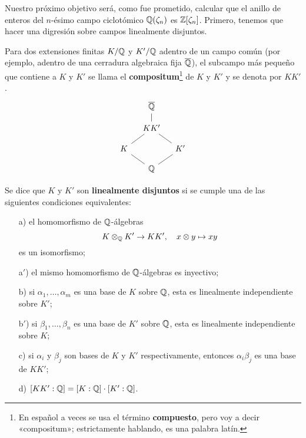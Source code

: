 Nuestro próximo objetivo será, como fue prometido, calcular que el anillo de
enteros del $n$-ésimo campo ciclotómico $\mathbb{Q} (\zeta_n)$ es
$\mathbb{Z} [\zeta_n]$. Primero, tenemos que hacer una digresión sobre campos
linealmente disjuntos.

\begin{definicion}
  Para dos extensiones finitas $K/\mathbb{Q}$ y $K'/\mathbb{Q}$ adentro de un campo común
  (por ejemplo, adentro de una cerradura algebraica fija $\overline{\mathbb{Q}}$),
  el subcampo más pequeño que contiene a $K$ y $K'$ se llama el
  \textbf{compositum}\footnote{En español a veces se usa el término
    \textbf{compuesto}, pero voy a decir «compositum»; estrictamente hablando,
    es una palabra latín.} de $K$ y $K'$ y se denota por $K K'$.
  \[ \begin{tikzcd}[row sep=1em,column sep=1em]
    & \overline{\QQ}\ar[-]{d} \\
    & KK'\ar[-]{dl}\ar[-]{dr} \\
    K\ar[-]{dr} & & K'\ar[-]{dl} \\
    & \QQ
  \end{tikzcd} \]

  Se dice que $K$ y $K'$ son \textbf{linealmente disjuntos} si se cumple una
  de las siguientes condiciones equivalentes:
  \begin{enumerate}
  \item[a)] el homomorfismo de $\mathbb{Q}$-álgebras
    $$K\otimes_{\mathbb{Q}} K'\to K K', \quad x\otimes y \mapsto xy$$
    es un isomorfismo;

  \item[a${}'$)] el mismo homomorfismo de $\mathbb{Q}$-álgebras es inyectivo;

  \item[b)] si $\alpha_1, \ldots, \alpha_m$ es una base de $K$ sobre $\mathbb{Q}$,
    esta es linealmente independiente sobre $K'$;

  \item[b${}'$)] si $\beta_1, \ldots, \beta_n$ es una base de $K'$ sobre $\mathbb{Q}$,
    esta es linealmente independiente sobre $K$;

  \item[c)] si $\alpha_i$ y $\beta_j$ son bases de $K$ y $K'$ respectivamente,
    entonces $\alpha_i \beta_j$ es una base de $K K'$;

  \item[d)] $[KK' : \mathbb{Q}] = [K : \mathbb{Q}]\cdot [K' : \mathbb{Q}]$.
  \end{enumerate}
\end{definicion}

